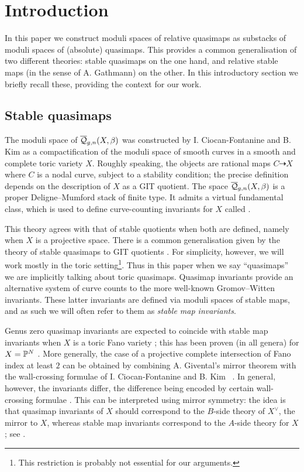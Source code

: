 \section{Introduction}
In this paper we construct moduli spaces of relative quasimaps as substacks of moduli spaces of (absolute) quasimaps. This provides a common generalisation of two different theories: stable quasimaps on the one hand, and relative stable maps (in the sense of A. Gathmann) on the other. In this introductory section we briefly recall these, providing the context for our work.

\subsection{Stable quasimaps}
The moduli space of  $\overline{\mathcal Q}_{g,n}(X,\beta)$ was constructed by I. Ciocan-Fontanine and B. Kim \cite{CF-K} as a compactification of the moduli space of smooth curves in a smooth and complete toric variety $X$. Roughly speaking, the objects are rational maps $C \dashrightarrow X$ where $C$ is a nodal curve, subject to a stability condition; the precise definition depends on the description of $X$ as a GIT quotient.  The space $\overline{\mathcal Q}_{g,n}(X,\beta)$ is a proper Deligne--Mumford stack of finite type.  It admits a virtual fundamental class, which is used to define curve-counting invariants for $X$ called .

This theory agrees with that of stable quotients \cite{MOP} when both are defined, namely when $X$ is a projective space.  There is a common generalisation given by the theory of stable quasimaps to GIT quotients \cite{CFKM}. For simplicity, however, we will work mostly in the toric setting\footnote{This restriction is probably not essential for our arguments.}. Thus in this paper when we say ``quasimaps'' we are implicitly talking about toric quasimaps.
Quasimap invariants provide an alternative system of curve counts to the more well-known Gromov--Witten invariants. These latter invariants are defined via moduli spaces of stable maps, and as such we will often refer to them as \emph{stable map invariants}.

Genus zero quasimap invariants are expected to coincide with stable map invariants when $X$ is a toric Fano variety \cite{CM}; this has been proven (in all genera) for $X=\mathbb P^N$ \cite[Theorem 3]{MOP} \cite[\S 5.4]{Manolache-Push}. More generally, the case of a projective complete intersection of Fano index at least $2$ can be obtained by combining A. Givental's mirror theorem \cite[Theorem 0.1]{Givental-mirror} with the wall-crossing formulae of I. Ciocan-Fontanine and B. Kim \cite[Conjecture 7.2.10]{CF-K}\  \cite[\S 5.5 and Conjecture 6.3.1]{CF-K-wallcrossing}.
In general, however, the invariants differ, the difference being encoded by certain wall-crossing formulae \cite{CF-K-wallcrossing}. This can be interpreted using mirror symmetry: the idea is that quasimap invariants of $X$ should correspond to the $B$-side theory of $X^\vee$, the mirror to $X$, whereas stable map invariants correspond to the $A$-side theory for $X$; see \cite[\S 7]{CF-K}.

